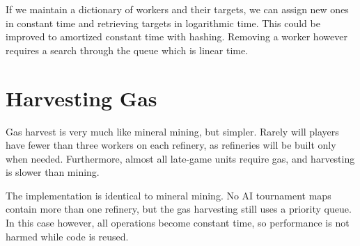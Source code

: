 If we maintain a dictionary of workers and their targets, we can assign new ones in constant time and retrieving targets in logarithmic time. This could be improved to amortized constant time with hashing. Removing a worker however requires a search through the queue which is linear time.


\section{Harvesting Gas}	
Gas harvest is very much like mineral mining, but simpler. Rarely will players have fewer than three workers on each refinery, as refineries will be built only when needed. Furthermore, almost all late-game units require gas, and harvesting is slower than mining.

The implementation is identical to mineral mining. No AI tournament maps contain more than one refinery, but the gas harvesting still uses a priority queue. In this case however, all operations become constant time, so performance is not harmed while code is reused.

